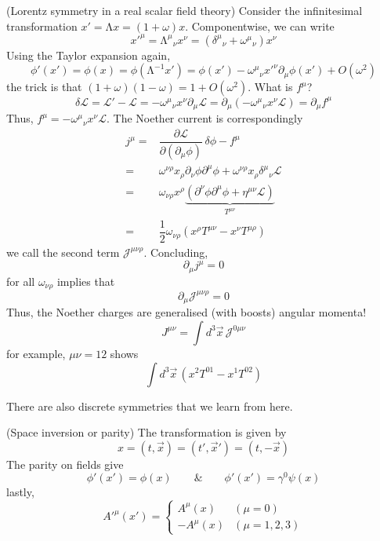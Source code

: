 \vspace{2ex}
\begin{ex}
(Lorentz symmetry in a real scalar field theory) Consider the infinitesimal transformation $x'=\mathrm{\Lambda }x=(1+\omega )x$. Componentwise, we can write
\[x'^{\mu }=\mathrm{\Lambda }^{\mu }{}_{\nu }x^{\nu }=(\delta ^{\mu }{}_{\nu }+\omega ^{\mu }{}_{\nu })x^{\nu }\]
Using the Taylor expansion again,
\[\phi'(x')=\phi (x)=\phi (\mathrm{\Lambda }^{-1}x')=\phi (x')-\omega ^{\mu }{}_{\nu }x'^{\nu }\partial _{\mu }\phi (x')+O(\omega ^2)\]
the trick is that $(1+\omega )(1-\omega )=1+O(\omega ^2)$. What is $f^{\mu }$?
\[\delta \mathcal{L}=\mathcal{L}'-\mathcal{L}=-\omega ^{\mu }{}_{\nu }x^{\nu }\partial _{\mu }\mathcal{L}=\partial _{\mu }(-\omega ^{\mu }{}_{\nu }x^{\nu }\mathcal{L})=\partial _{\mu }f^{\mu }\]
Thus, $f^{\mu }=-\omega ^{\mu }{}_{\nu }x^{\nu }\mathcal{L}$. The Noether current is correspondingly
\[\begin{align*}
j^{\mu }=&\dfrac{\partial \mathcal{L}}{\partial (\partial _{\mu }\phi )}\,\delta \phi -f^{\mu }\\
=&\omega ^{\nu \rho }x_{\rho }\partial _{\nu }\phi \partial ^{\mu }\phi +\omega ^{\nu \rho }x_{\rho }\delta ^{\mu }{}_{\nu }\mathcal{L}\\
=&\omega _{\nu \rho }x^{\rho }\underbrace{(\partial ^{\nu }\phi \partial ^{\mu }\phi +\eta ^{\mu \nu }\mathcal{L})}_{T^{\mu \nu }}\\
=&\dfrac{1}{2}\omega _{\nu \rho }(x^{\rho }T^{\mu \nu }-x^{\nu }T^{\mu \rho })
\end{align*}\]
we call the second term $\mathcal{J}^{\mu \nu \rho }$. Concluding,
\[\partial _{\mu }j^{\mu }=0\]
for all $\omega _{\nu \rho }$ implies that
\[\partial _{\mu }\mathcal{J}^{\mu \nu \rho }=0\]
Thus, the Noether charges are generalised (with boosts) angular momenta!
\[J^{\mu \nu }=\int d^3\vec{x}\,\mathcal{J}^{0\mu \nu }\]
for example, $\mu \nu =12$ shows
\[\int d^3\vec{x}\,(x^2T^{01}-x^{1}T^{02})\]
\end{ex}
\vspace{2ex}
\begin{rmk}
There are also discrete symmetries that we learn from here.
\end{rmk}
\vspace{2ex}
\begin{defi}
(Space inversion or parity) The transformation is given by
\[x=(t,\vec{x})=(t',\vec{x}')=(t,-\vec{x})\]
The parity on fields give
\[\phi '(x')=\phi (x)\qquad\&\qquad \phi '(x')=\gamma ^{0}\psi (x)\]
lastly,
\[A'^{\mu }(x')=\begin{cases}
A^{\mu }(x)&(\mu =0)\\
-A^{\mu }(x)&(\mu =1,2,3)
\end{cases}\]
\end{defi}
